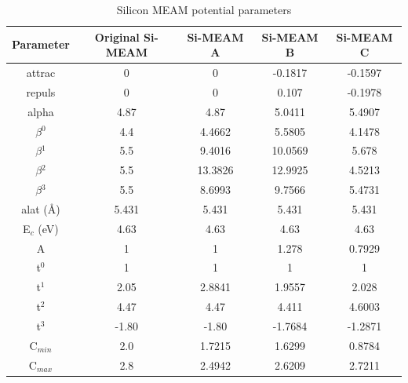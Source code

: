 \documentclass[review]{elsarticle}
\begin{document}
\begin{table}[h]
\caption{Silicon MEAM potential parameters}\label{tab:ben1}
\begin{center}
\begin{tabular}{|c|c|c|c|c|}
     \hline
     Parameter & Original Si-MEAM  & Si-MEAM A & Si-MEAM B  & Si-MEAM C \\
     \hline
     attrac & 0 & 0 & -0.1817 & -0.1597 \\
     repuls & 0 & 0 & 0.107 & -0.1978 \\
     alpha & 4.87 & 4.87 & 5.0411 & 5.4907 \\
     $\beta$$^{0}$ & 4.4 & 4.4662 & 5.5805 & 4.1478 \\
     $\beta$$^{1}$ & 5.5 & 9.4016  & 10.0569 & 5.678\\
     $\beta$$^{2}$ & 5.5 & 13.3826 & 12.9925 & 4.5213 \\  
     $\beta$$^{3}$ & 5.5 & 8.6993 & 9.7566 & 5.4731 \\
     alat (\AA) & 5.431 & 5.431 & 5.431 & 5.431 \\
     E$_{c}$ (eV) & 4.63 & 4.63 & 4.63 & 4.63\\
     A & 1 & 1 & 1.278 & 0.7929\\
     t$^{0}$ & 1 & 1 & 1 & 1\\
     t$^{1}$ & 2.05 & 2.8841 & 1.9557 & 2.028 \\
     t$^{2}$ & 4.47 & 4.47 & 4.411 & 4.6003\\
     t$^{3}$ & -1.80 & -1.80  & -1.7684 & -1.2871\\
     C$_{min}$ & 2.0 & 1.7215 & 1.6299 & 0.8784 \\ 
     C$_{max}$ & 2.8 & 2.4942 & 2.6209 & 2.7211 \\
     \hline
\end{tabular}
\end{center}
\label{default}
\end{table}%
\end{document}
